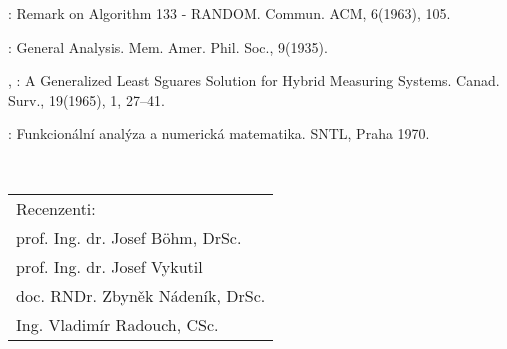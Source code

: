 \begin{enumerate}[label={[\arabic*]}]
\item {}: Remark on Algorithm 133 - RANDOM. Commun.
  ACM, 6(1963), 105.

\item {}: General Analysis. Mem. Amer. Phil. Soc.,
  9(1935).

\item {}, : A Generalized Least Sguares
  Solution for Hybrid Measuring Systems. Canad. Surv., 19(1965), 1,
  27--41.

\item {}: Funkcionální analýza a numerická matematika.
  SNTL, Praha 1970.

\end{enumerate}

~

\begin{flushright}
  \begin{tabular}[t]{l}
    Recenzenti:\\[1ex]
    \hspace{5ex}prof. Ing. dr. Josef Böhm, DrSc.  \\
    \hspace{5ex}prof. Ing. dr. Josef Vykutil      \\
    \hspace{5ex}doc. RNDr. Zbyněk Nádeník, DrSc.  \\
    \hspace{5ex}Ing. Vladimír Radouch, CSc.       \\

  \end{tabular}
\end{flushright}
